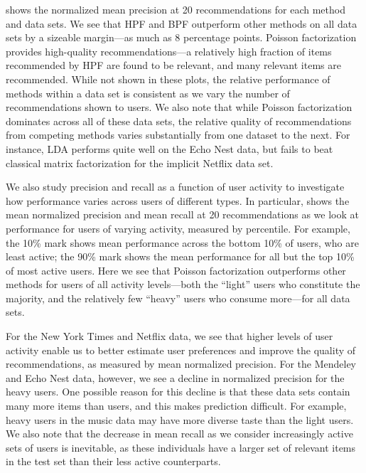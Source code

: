  shows the normalized mean precision at 20
recommendations for each method and data sets. We see that HPF and BPF
outperform other methods on all data sets by a sizeable margin---as
much as 8 percentage points. Poisson factorization provides high-quality
recommendations---a relatively high fraction of items recommended
by HPF are found to be relevant, and many relevant items are
recommended. While not shown in these plots, the relative performance
of methods within a data set is consistent as we vary the number of
recommendations shown to users. We also note that while Poisson
factorization dominates across all of these data sets, the relative
quality of recommendations from competing methods varies substantially
from one dataset to the next. For instance, LDA performs quite well on
the Echo Nest data, but fails to beat classical matrix factorization
for the implicit Netflix data set.

We also study precision and recall as a function of user activity to
investigate how performance varies across users of different types. In
particular,  shows the mean
normalized precision and mean recall at 20 recommendations as we look
at performance for users of varying activity, measured by
percentile. For example, the 10\% mark shows mean performance across
the bottom 10\% of users, who are least active; the 90\% mark shows
the mean performance for all but the top 10\% of most active users. Here
we see that Poisson factorization outperforms other methods for users
of all activity levels---both the ``light'' users who constitute the
majority, and the relatively few ``heavy'' users who consume
more---for all data sets.

For the New York Times and Netflix data, we see that higher levels of
user activity enable us to better estimate user preferences and
improve the quality of recommendations, as measured by mean normalized
precision. For the Mendeley and Echo Nest data, however, we see a
decline in normalized precision for the heavy users.  One possible
reason for this decline is that these data sets contain many more
items than users, and this makes prediction difficult.  For example,
heavy users in the music data may have more diverse taste than the
light users.
We also note that the decrease in mean recall as we consider
increasingly active sets of users is inevitable, as these individuals
have a larger set of relevant items in the test set than their less
active counterparts. 

